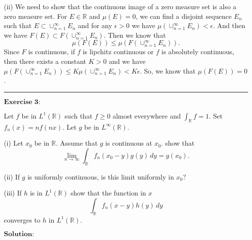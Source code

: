 \documentclass[12pt,a4paper]{ctexart}
\begin{document}
(ii) We need to show that the continuous image of a zero measure set is also a zero measure set. For $E \in \mathbb{R}$ and $\mu(E) = 0$, we can find a disjoint sequence ${E_{n}}$ such that $E \subset \cup_{n=1}^{\infty} E_{n}$ and for any $\epsilon > 0$ we have $\mu(\cup_{n=1}^{\infty} E_{n}) < \epsilon$. And then we have $F(E) \subset F(\cup_{n=1}^{\infty} E_{n}) $. Then we know that
\begin{equation*}
    \mu(F(E)) \leq \mu(F(\cup_{n=1}^{\infty} E_{n})) .
\end{equation*}
Since $F$ is continuous, if $f$ is lipchitz continuous or $f$ is absolutely continuous, then there exists a constant $K > 0$ and we have $\mu(F(\cup_{n=1}^{\infty} E_{n}))  \leq K \mu(\cup_{n=1}^{\infty} E_{n}) < K \epsilon$. So, we know that $\mu(F(E)) = 0$.
 
\noindent\rule[0.25\baselineskip]{\textwidth}{0.5pt}

\vspace{8pt}

$\textbf{Exercise 3:}$

Let $f$ be in $L^{1}(\mathbb{R})$ such that $f \geq 0$ almost everywhere and $\int_{\mathbb{R}}^{} f = 1$. Set $f_{n} (x) = n f(n x)$. Let $g$ be in $L^{\infty}(\mathbb{R})$.

(i) Let $x_{0}$ be in $\mathbb{R}$. Assume that $g$ is continuous at $x_{0}$. show that
\begin{equation*}
   \lim_{n \to \infty} \int_{\mathbb{R}}^{} f_{n}(x_{0} - y) g(y) \, d y = g(x_{0}).
\end{equation*}

(ii) If $g$ is uniformly continuous, is this limit uniformly in $x_{0}$?

(iii) If $h$ is in $L^{1}(\mathbb{R})$ show that the function in $x$
\begin{equation*}
    \int_{\mathbb{R}}^{} f_{n} (x - y) h(y) \, d y
\end{equation*}
converges to $h$ in $L^{1}(\mathbb{R})$.

\vspace{8pt}
$\textbf{Solution:}$
\end{document}
